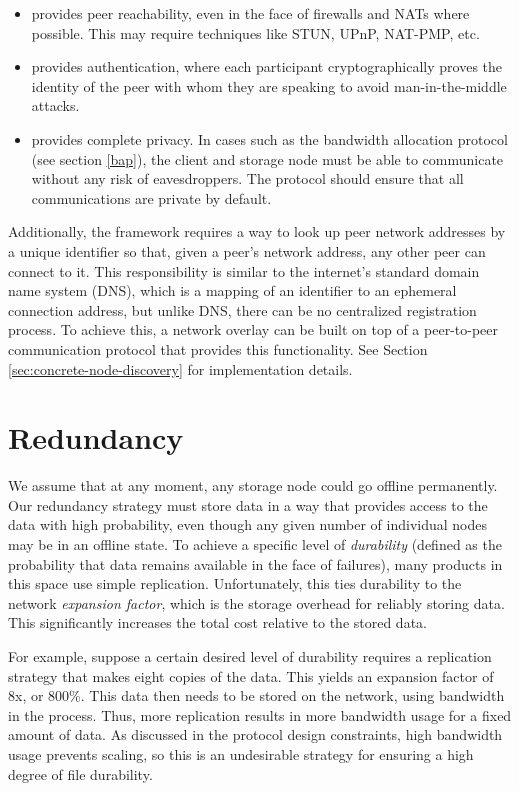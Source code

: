 \documentclass[8pt,fleqn,openany]{book}
\begin{document}
\begin{itemize}
\item provides peer reachability, even in the face of firewalls
and NATs where possible.
This may require techniques like STUN, UPnP, NAT-PMP, etc.
\item provides authentication, where each participant cryptographically
proves the identity of the peer with whom they are speaking to avoid
man-in-the-middle attacks.
\item provides complete privacy. In cases such as the bandwidth allocation
protocol (see section \ref{bap}), the client and storage node must be able
to communicate without any risk of eavesdroppers. The protocol should
ensure that all communications are private by default.
\end{itemize}

Additionally, the framework requires a way to look up peer network addresses
by a unique identifier so that, given a peer's network address, any other
peer can connect to it. This responsibility is similar to the internet's
standard domain name system (DNS), which is a mapping of an identifier to an
ephemeral connection address, but unlike DNS, there can be no centralized
registration process.
To achieve this, a network overlay can be
built on top of a peer-to-peer communication protocol that provides this
functionality. See Section \ref{sec:concrete-node-discovery} for
implementation details.

\section{Redundancy}\label{sec:framework-redundancy}

We assume that at any moment, any storage node could go offline permanently.
Our redundancy
strategy must store data in a way that provides access to the data with high
probability, even though any given number of individual nodes may be in
an offline state. To
achieve a specific level of {\em durability} (defined as the probability that
data remains available in the face of failures), many products in this space use
simple replication. Unfortunately, this ties durability to the network {\em
expansion factor}, which is the storage overhead for reliably storing data. This
significantly increases the total cost relative to the stored data.

For example, suppose a certain desired level of durability requires a
replication strategy that makes eight copies of the data. This yields an
expansion factor of 8x, or 800\%. This data then needs to be stored on the
network, using bandwidth in the process. Thus, more replication results in more
bandwidth usage for a fixed amount of data. As discussed in the protocol design
constraints, high bandwidth usage prevents scaling, so this is an undesirable
strategy for ensuring a high degree of file durability.
\end{document}
